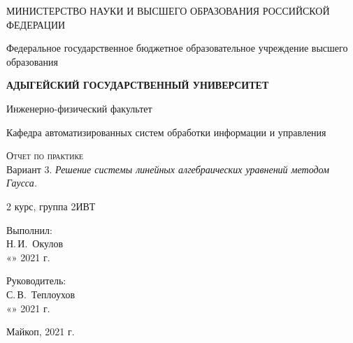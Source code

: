 \documentclass[12pt,a4paper]{scrartcl}
\begin{document}
	\begin{titlepage}
		\begin{center}
			\large
			МИНИСТЕРСТВО НАУКИ И ВЫСШЕГО ОБРАЗОВАНИЯ РОССИЙСКОЙ ФЕДЕРАЦИИ
			
			Федеральное государственное бюджетное образовательное учреждение высшего образования
			
			\textbf{АДЫГЕЙСКИЙ ГОСУДАРСТВЕННЫЙ УНИВЕРСИТЕТ}
			\vspace{0.25cm}
			
			Инженерно-физический факультет
			
			Кафедра автоматизированных систем обработки информации и управления
			\vfill

			\vfill
			
			\textsc{Отчет по практике}\\[5mm]
			
			{\LARGE Вариант 3. \textit{Решение системы линейных алгебраических уравнений методом Гаусса.}}
			\bigskip
			
			2 курс, группа 2ИВТ
		\end{center}
		\vfill
		
		\newlength{\ML}
		\hfill\begin{minipage}{0.5\textwidth}
			Выполнил:\\
			\underline{\hspace{\ML}} Н.\,И.~Окулов\\
			«\underline{\hspace{0.7cm}}» \underline{\hspace{2cm}} 2021 г.
		\end{minipage}%
		\bigskip
		
		\hfill\begin{minipage}{0.5\textwidth}
			Руководитель:\\
			\underline{\hspace{\ML}} С.\,В.~Теплоухов\\
			«\underline{\hspace{0.7cm}}» \underline{\hspace{2cm}} 2021 г.
		\end{minipage}%
		\vfill
		
		\begin{center}
			Майкоп, 2021 г.
		\end{center}
	\end{titlepage}
\end{document}
